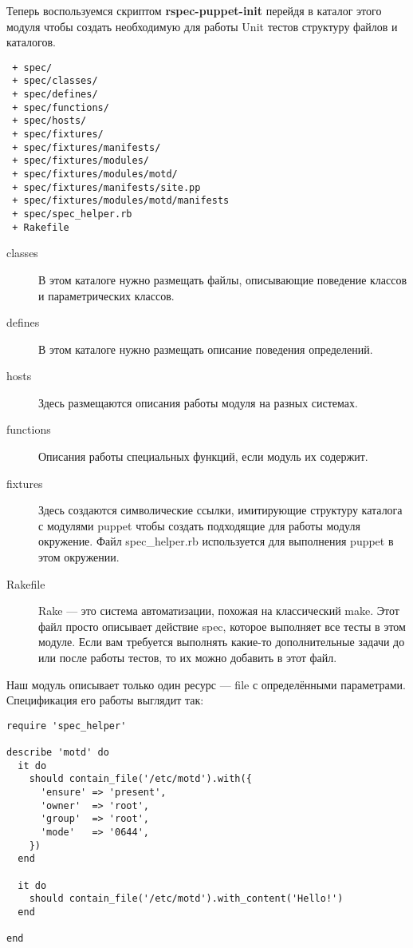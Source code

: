 
Теперь воспользуемся скриптом \textbf{rspec-puppet-init} перейдя в каталог этого модуля чтобы создать необходимую для работы Unit тестов структуру файлов и каталогов.

\begin{verbatim}
 + spec/
 + spec/classes/
 + spec/defines/
 + spec/functions/
 + spec/hosts/
 + spec/fixtures/
 + spec/fixtures/manifests/
 + spec/fixtures/modules/
 + spec/fixtures/modules/motd/
 + spec/fixtures/manifests/site.pp
 + spec/fixtures/modules/motd/manifests
 + spec/spec_helper.rb
 + Rakefile
\end{verbatim}

\begin{description}
\item[classes] В этом каталоге нужно размещать файлы, описывающие поведение классов и параметрических классов.
\item[defines] В этом каталоге нужно размещать описание поведения определений.
\item[hosts] Здесь размещаются описания работы модуля на разных системах.
\item[functions] Описания работы специальных функций, если модуль их содержит.
\item[fixtures] Здесь создаются символические ссылки, имитирующие структуру каталога с модулями puppet чтобы создать подходящие для работы модуля окружение. Файл spec\_helper.rb используется для выполнения puppet в этом окружении.
\item[Rakefile] Rake --- это система автоматизации, похожая на классический make. Этот файл просто описывает действие spec, которое выполняет все тесты в этом модуле. Если вам требуется выполнять какие-то дополнительные задачи до или после работы тестов, то их можно добавить в этот файл.
\end{description}

Наш модуль описывает только один ресурс --- file с определёнными параметрами. Спецификация его работы выглядит так:

\begin{verbatim}
require 'spec_helper'

describe 'motd' do
  it do
    should contain_file('/etc/motd').with({
      'ensure' => 'present',
      'owner'  => 'root',
      'group'  => 'root',
      'mode'   => '0644',
    })
  end

  it do
    should contain_file('/etc/motd').with_content('Hello!')
  end

end
\end{verbatim}

